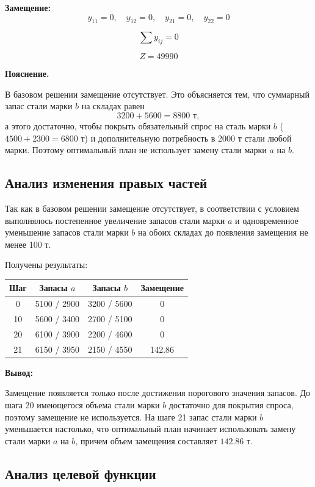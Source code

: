 \documentclass[a4paper,12pt]{article}
\begin{document}
\textbf{Замещение:}
\[
y_{11} = 0,\quad y_{12} = 0,\quad y_{21} = 0,\quad y_{22} = 0
\]

\[
\sum y_{ij} = 0
\]

\[
Z = 49990
\]

\textbf{Пояснение.}

В базовом решении замещение отсутствует. Это объясняется тем, что суммарный
запас стали марки $b$ на складах равен
\[
3200 + 5600 = 8800 \text{ т},
\]
а этого достаточно, чтобы покрыть обязательный спрос на сталь марки $b$
($4500 + 2300 = 6800$ т) и дополнительную потребность в 2000 т стали любой
марки. Поэтому оптимальный план не использует замену стали марки $a$ на $b$.

\subsection{Анализ изменения правых частей}

Так как в базовом решении замещение отсутствует, в соответствии с условием
выполнялось постепенное увеличение запасов стали марки $a$ и одновременное
уменьшение запасов стали марки $b$ на обоих складах до появления замещения
не менее 100 т.

Получены результаты:

\begin{center}
\begin{tabular}{cccc}
\toprule
Шаг & Запасы $a$ & Запасы $b$ & Замещение \\
\midrule
0 & 5100 / 2900 & 3200 / 5600 & 0 \\
10 & 5600 / 3400 & 2700 / 5100 & 0 \\
20 & 6100 / 3900 & 2200 / 4600 & 0 \\
21 & 6150 / 3950 & 2150 / 4550 & 142.86 \\
\bottomrule
\end{tabular}
\end{center}

\textbf{Вывод:}

Замещение появляется только после достижения порогового значения запасов.
До шага 20 имеющегося объема стали марки $b$ достаточно для покрытия спроса,
поэтому замещение не используется. На шаге 21 запас стали марки $b$
уменьшается настолько, что оптимальный план начинает использовать замену
стали марки $a$ на $b$, причем объем замещения составляет $142.86$ т.

\subsection{Анализ целевой функции}
\end{document}
